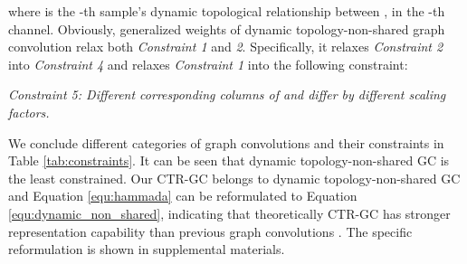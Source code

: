 \documentclass[10pt,twocolumn,letterpaper]{article}
\begin{document}
where  is the -th sample's dynamic topological relationship between ,  in the -th channel. Obviously, generalized weights of dynamic topology-non-shared graph convolution relax both \textit{Constraint 1} and \textit{2}. Specifically, it relaxes \textit{Constraint 2} into \textit{Constraint 4} and relaxes \textit{Constraint 1} into the following constraint:

\noindent \textit{Constraint 5: Different corresponding columns of  and  differ by different scaling factors.}

\begin{table}
	\begin{center}
	\end{center}
	\vspace{-0.2cm}
	\caption{Constraints on different categories of graph convolutions and corresponding instances. The number 1-5 correspond to five constraints. {\color{red}Red}, {\color{green}Green} and {\color{blue}Blue} respectively indicate the relatively {\color{red}High}, {\color{green}Mid} and {\color{blue}Low} constraint strength.}
	\label{tab:constraints}
	\vspace{-0.3cm}
\end{table}

We conclude different categories of graph convolutions and their constraints in Table \ref{tab:constraints}. It can be seen that dynamic topology-non-shared GC is the least constrained. Our CTR-GC belongs to dynamic topology-non-shared GC and Equation \ref{equ:hammada} can be reformulated to Equation \ref{equ:dynamic_non_shared}, indicating that theoretically CTR-GC has stronger representation capability than previous graph convolutions \cite{cheng2020eccv,shi2019two,yan2018spatial, ye2020dynamic}. The specific reformulation is shown in supplemental materials.
\end{document}
